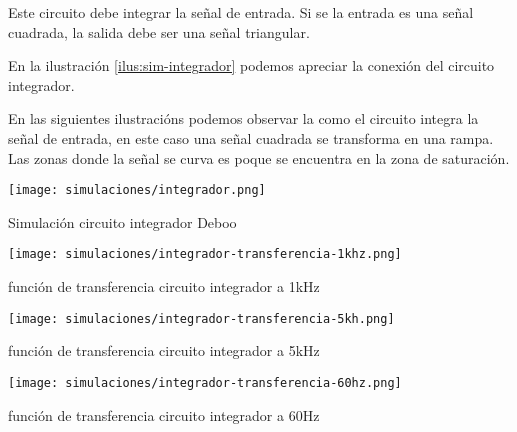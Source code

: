 Este circuito debe integrar la señal de entrada. Si se la entrada es una señal cuadrada, la salida debe ser una señal triangular.

En la ilustración \ref{ilus:sim-integrador} podemos apreciar la conexión del circuito integrador.

En las siguientes ilustracións podemos observar la como el circuito integra la señal de entrada, en este caso una señal cuadrada se transforma en una rampa. Las zonas donde la señal se curva es poque se encuentra en la zona de saturación.

\begin{ilustracion}[ht]
    \centering
    \texttt{[image: simulaciones/integrador.png]}
    \caption{Simulación circuito integrador Deboo}
    \label{ilus:sim-integrador}
\end{ilustracion}

\begin{ilustracion}[ht]
    \centering
    \texttt{[image: simulaciones/integrador-transferencia-1khz.png]}
    \caption{función de transferencia circuito integrador a 1kHz}
    \label{ilus:sim-integrador-1k}
\end{ilustracion}

\begin{ilustracion}[ht]
    \centering
    \texttt{[image: simulaciones/integrador-transferencia-5kh.png]}
    \caption{función de transferencia circuito integrador a 5kHz}
    \label{ilus:sim-integrador-5k}
\end{ilustracion}

\begin{ilustracion}[ht]
    \centering
    \texttt{[image: simulaciones/integrador-transferencia-60hz.png]}
    \caption{función de transferencia circuito integrador a 60Hz}
    \label{ilus:sim-integrador-60}
\end{ilustracion}
